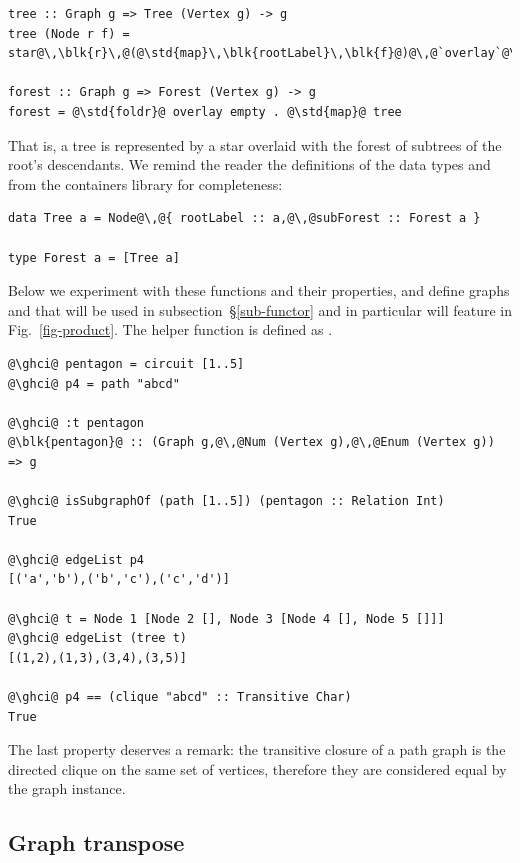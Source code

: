 \begin{verbatim}
tree :: Graph g => Tree (Vertex g) -> g
tree (Node r f) = star@\,\blk{r}\,@(@\std{map}\,\blk{rootLabel}\,\blk{f}@)@\,@`overlay`@\,\blk{forest}\,@f

forest :: Graph g => Forest (Vertex g) -> g
forest = @\std{foldr}@ overlay empty . @\std{map}@ tree
\end{verbatim}

\noindent
That is, a tree is represented by a star overlaid with the forest
of subtrees of the root's descendants. We remind the reader the
definitions of the data types  and  from the
\textsf{containers} library for completeness:

\begin{verbatim}
data Tree a = Node@\,@{ rootLabel :: a,@\,@subForest :: Forest a }

type Forest a = [Tree a]
\end{verbatim}

Below we experiment with these functions and their properties, and define
graphs  and  that will be used in subsection~\S\ref{sub-functor}
and in particular will feature in Fig.~\ref{fig-product}. The helper function
 is defined as .

\begin{verbatim}
@\ghci@ pentagon = circuit [1..5]
@\ghci@ p4 = path "abcd"

@\ghci@ :t pentagon
@\blk{pentagon}@ :: (Graph g,@\,@Num (Vertex g),@\,@Enum (Vertex g)) => g

@\ghci@ isSubgraphOf (path [1..5]) (pentagon :: Relation Int)
True

@\ghci@ edgeList p4
[('a','b'),('b','c'),('c','d')]

@\ghci@ t = Node 1 [Node 2 [], Node 3 [Node 4 [], Node 5 []]]
@\ghci@ edgeList (tree t)
[(1,2),(1,3),(3,4),(3,5)]

@\ghci@ p4 == (clique "abcd" :: Transitive Char)
True
\end{verbatim}

The last property deserves a remark: the transitive closure of a path graph
is the directed clique on the same set of vertices, therefore they are considered equal
by the  graph instance.

\subsection{Graph transpose}


